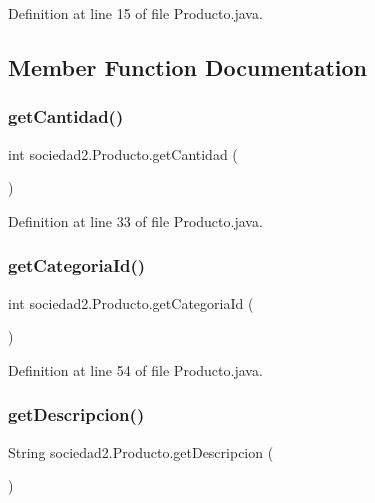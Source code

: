 Definition at line 15 of file Producto.\+java.



\subsection{Member Function Documentation}
\mbox{\label{classsociedad2_1_1_producto_ad1dffeff2d5eaa28cb0f4c3120bbf047}} 
\subsubsection{\texorpdfstring{get\+Cantidad()}{getCantidad()}}
{\footnotesize\ttfamily int sociedad2.\+Producto.\+get\+Cantidad (\begin{DoxyParamCaption}{ }\end{DoxyParamCaption})}



Definition at line 33 of file Producto.\+java.

\mbox{\label{classsociedad2_1_1_producto_af32a011e6aa2e99af8882774a23bd368}} 
\subsubsection{\texorpdfstring{get\+Categoria\+Id()}{getCategoriaId()}}
{\footnotesize\ttfamily int sociedad2.\+Producto.\+get\+Categoria\+Id (\begin{DoxyParamCaption}{ }\end{DoxyParamCaption})}



Definition at line 54 of file Producto.\+java.

\mbox{\label{classsociedad2_1_1_producto_a83b7e522c9dc622e0ca99a3b6243b57b}} 
\subsubsection{\texorpdfstring{get\+Descripcion()}{getDescripcion()}}
{\footnotesize\ttfamily String sociedad2.\+Producto.\+get\+Descripcion (\begin{DoxyParamCaption}{ }\end{DoxyParamCaption})}



